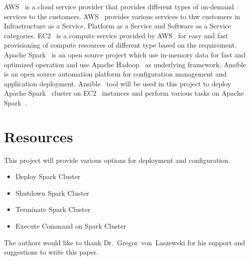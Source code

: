 AWS~\cite{hid-sp18-511-www-aws} is a cloud service
provider that provides different types of on-demand services to the
customers. AWS~\cite{hid-sp18-511-www-aws} provides
various services to thw customers in Infrastructure as a Service, Platform as a
Service and Software as a Service categories. EC2~\cite{hid-sp18-511-www-ec2} is a compute service provided by
AWS~\cite{hid-sp18-511-www-aws} for easy and fast
provisioning of compute resources of different type based on the
requirement. Apache Spark~\cite{hid-sp18-511-www-spark} is an open source
project which use in-memory data for fast and optimized operation and
use Apache Hadoop~\cite{hid-sp18-511-www-hadoop} as underlying
framework. Ansible~\cite{hid-sp18-511-www-ansible} is an open source automation platform
for configuration management and application
deployment. Ansible~\cite{hid-sp18-511-www-ansible} tool will be used
in this project to deploy Apache Spark~\cite{hid-sp18-511-www-spark}
cluster on EC2~\cite{hid-sp18-511-www-ec2}
instances and perform various tasks on Apache
Spark~\cite{hid-sp18-511-www-spark}.

\section{Resources}
This project will provide various options for deployment and
configuration.

\begin{itemize}
	\item Deploy Spark Cluster
        \item Shutdown Spark Cluster
        \item Terminate Spark Cluster
        \item Execute Command on Spark Cluster
\end{itemize}

\begin{acks}

  The authors would like to thank Dr.~Gregor~von~Laszewski for his
  support and suggestions to write this paper.

\end{acks}


 

